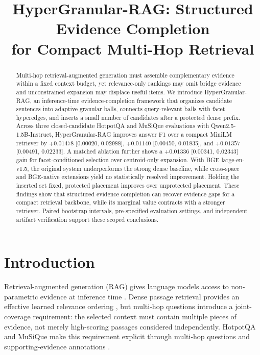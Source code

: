 \documentclass[11pt]{article}
\title{HyperGranular-RAG: Structured Evidence Completion\\
for Compact Multi-Hop Retrieval}
\newcommand{\hgrag}{HyperGranular-RAG\xspace}
\begin{document}
\maketitle

\begin{abstract}
Multi-hop retrieval-augmented generation must assemble complementary evidence
within a fixed context budget, yet relevance-only rankings may omit bridge
evidence and unconstrained expansion may displace useful items. We introduce
\hgrag, an inference-time evidence-completion framework that organizes
candidate sentences into adaptive granular balls, connects query-relevant
balls with facet hyperedges, and inserts a small number of candidates after a
protected dense prefix. Across three closed-candidate HotpotQA and MuSiQue
evaluations with Qwen2.5-1.5B-Instruct, \hgrag improves answer F1 over a
compact MiniLM retriever by $+0.01478$ [0.00020, 0.02988],
$+0.01140$ [0.00450, 0.01835], and $+0.01357$ [0.00491, 0.02233].
A matched ablation further shows a $+0.01336$ [0.00341, 0.02343] gain for
facet-conditioned selection over centroid-only expansion. With BGE
large-en-v1.5, the original system underperforms the strong dense baseline,
while cross-space and BGE-native extensions yield no statistically resolved
improvement. Holding the inserted set fixed, protected placement improves over
unprotected placement. These findings show that structured evidence completion
can recover evidence gaps for a compact retrieval backbone, while its marginal
value contracts with a stronger retriever. Paired bootstrap intervals,
pre-specified evaluation settings, and independent artifact verification
support these scoped conclusions.
\end{abstract}

\section{Introduction}

Retrieval-augmented generation (RAG) gives language models access to
non-parametric evidence at inference time
\citep{lewis2020rag,guu2020realm}. Dense passage retrieval provides an
effective learned relevance ordering \citep{karpukhin2020dpr}, but multi-hop
questions introduce a joint-coverage requirement: the selected context must
contain multiple pieces of evidence, not merely high-scoring passages
considered independently. HotpotQA and MuSiQue make this requirement explicit
through multi-hop questions and supporting-evidence annotations
\citep{yang2018hotpotqa,trivedi2022musique}.
\end{document}
